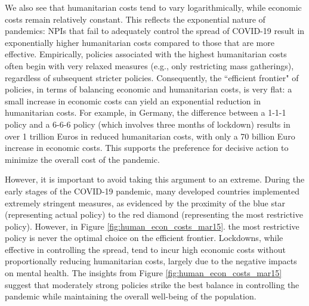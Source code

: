 \documentclass[msom,blindrev]{informs3} %
\begin{document}
We also see that humanitarian costs tend to vary logarithmically, while economic costs remain relatively constant. This reflects the exponential nature of pandemics: NPIs that fail to adequately control the spread of COVID-19 result in exponentially higher humanitarian costs compared to those that are more effective. Empirically, policies associated with the highest humanitarian costs often begin with very relaxed measures (e.g., only restricting mass gatherings), regardless of subsequent stricter policies. Consequently, the ``efficient frontier" of policies, in terms of balancing economic and humanitarian costs, is very flat: a small increase in economic costs can yield an exponential reduction in humanitarian costs. For example, in Germany, the difference between a 1-1-1 policy and a 6-6-6 policy (which involves three months of lockdown) results in over 1 trillion Euros in reduced humanitarian costs, with only a 70 billion Euro increase in economic costs. This supports the preference for decisive action to minimize the overall cost of the pandemic.

However, it is important to avoid taking this argument to an extreme. During the early stages of the COVID-19 pandemic, many developed countries implemented extremely stringent measures, as evidenced by the proximity of the blue star (representing actual policy) to the red diamond (representing the most restrictive policy). However, in Figure \ref{fig:human_econ_costs_mar15}. the most restrictive policy is never the optimal choice on the efficient frontier. Lockdowns, while effective in controlling the spread, tend to incur high economic costs without proportionally reducing humanitarian costs, largely due to the negative impacts on mental health. The insights from Figure \ref{fig:human_econ_costs_mar15} suggest that moderately strong policies strike the best balance in controlling the pandemic while maintaining the overall well-being of the population.
\end{document}
